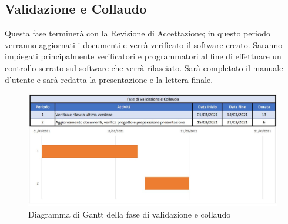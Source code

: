 \documentclass[../piano_di_progetto.tex]{subfiles}
\begin{document}
\subsection{Validazione e Collaudo}%
\label{sub:valid_coll}
Questa fase terminerà con la Revisione di Accettazione; in questo periodo verranno aggiornati i documenti e verrà verificato il software creato. Saranno impiegati principalmente verificatori e programmatori al fine di effettuare un controllo serrato sul software che verrà rilasciato. Sarà completato il manuale d'utente e sarà redatta la presentazione e la lettera finale. 

\begin{figure}[H]
\centering

\includegraphics[width=12cm]{componenti/img/fase_valid_collaudo}

\caption{Diagramma di Gantt della fase di validazione e collaudo}
\end{figure}
\end{document}
